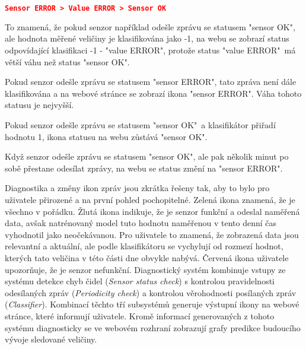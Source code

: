 \begin{lstlisting}[language=json]
	   Sensor ERROR > Value ERROR > Sensor OK
\end{lstlisting}

To znamená, že pokud senzor například odešle zprávu se statusem "sensor OK", ale hodnota měřené veličiny je klasifikována jako -1, na webu se zobrazí status odpovídající klasifikaci -1 - "value ERROR", protože status "value ERROR"\ má větší váhu než status "sensor OK". \par
Pokud senzor odešle zprávu se statusem "sensor ERROR", tato zpráva není dále klasifikována a na webové stránce se zobrazí ikona "sensor ERROR". Váha tohoto statusu je nejvyšší. \par
Pokud senzor odešle zprávu se statusem "sensor OK"\ a klasifikátor přiřadí hodnotu 1, ikona statusu na webu zůstává "sensor OK". \par
Když senzor odešle zprávu se statusem "sensor OK", ale pak několik minut po sobě přestane odesílat zprávy, na webu se status změní na "sensor ERROR". \par
Diagnostika a změny ikon zpráv jsou zkrátka řešeny tak, aby to bylo pro uživatele přirozené a na první pohled pochopitelné. Zelená ikona znamená, že je všechno v pořádku. Žlutá ikona indikuje, že je senzor funkční a odeslal naměřená data, avšak natrénovaný model tuto hodnotu naměřenou v tento denní čas vyhodnotil jako neočekávanou. Pro uživatele to znamená, že zobrazená data jsou relevantní a aktuální, ale podle klasifikátoru se vychylují od rozmezí hodnot, kterých tato veličina v této části dne obvykle nabývá. Červená ikona uživatele upozorňuje, že je senzor nefunkční. Diagnostický systém kombinuje vstupy ze systému detekce chyb čidel (\textit{Sensor status check}) s kontrolou pravidelnosti odesílaných zpráv (\textit{Periodicity check}) a kontrolou věrohodnosti posílaných zpráv (\textit{Classifier}). Kombinací těchto tří subsystémů generuje výstupní ikony na webové stránce, které informují uživatele. Kromě informací generovaných z tohoto systému diagnosticky se ve webovém rozhraní zobrazují grafy predikce budoucího vývoje sledované veličiny. 

